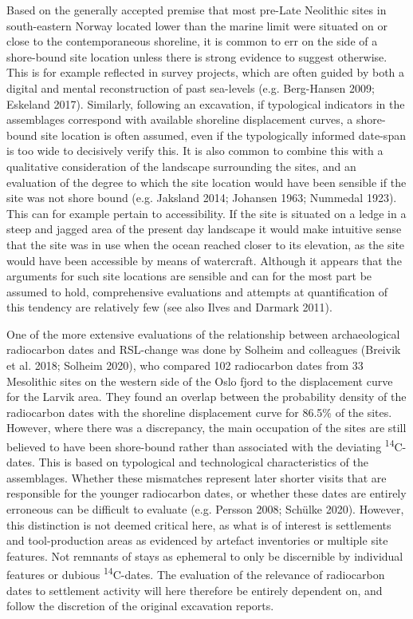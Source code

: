 \documentclass[
]{article}
\begin{document}
Based on the generally accepted premise that most pre-Late Neolithic sites in south-eastern Norway located lower than the marine limit were situated on or close to the contemporaneous shoreline, it is common to err on the side of a shore-bound site location unless there is strong evidence to suggest otherwise. This is for example reflected in survey projects, which are often guided by both a digital and mental reconstruction of past sea-levels (e.g. Berg-Hansen 2009; Eskeland 2017). Similarly, following an excavation, if typological indicators in the assemblages correspond with available shoreline displacement curves, a shore-bound site location is often assumed, even if the typologically informed date-span is too wide to decisively verify this. It is also common to combine this with a qualitative consideration of the landscape surrounding the sites, and an evaluation of the degree to which the site location would have been sensible if the site was not shore bound (e.g. Jaksland 2014; Johansen 1963; Nummedal 1923). This can for example pertain to accessibility. If the site is situated on a ledge in a steep and jagged area of the present day landscape it would make intuitive sense that the site was in use when the ocean reached closer to its elevation, as the site would have been accessible by means of watercraft. Although it appears that the arguments for such site locations are sensible and can for the most part be assumed to hold, comprehensive evaluations and attempts at quantification of this tendency are relatively few (see also Ilves and Darmark 2011).

One of the more extensive evaluations of the relationship between archaeological radiocarbon dates and RSL-change was done by Solheim and colleagues (Breivik et al. 2018; Solheim 2020), who compared 102 radiocarbon dates from 33 Mesolithic sites on the western side of the Oslo fjord to the displacement curve for the Larvik area. They found an overlap between the probability density of the radiocarbon dates with the shoreline displacement curve for 86.5\% of the sites. However, where there was a discrepancy, the main occupation of the sites are still believed to have been shore-bound rather than associated with the deviating \textsuperscript{14}C-dates. This is based on typological and technological characteristics of the assemblages. Whether these mismatches represent later shorter visits that are responsible for the younger radiocarbon dates, or whether these dates are entirely erroneous can be difficult to evaluate (e.g. Persson 2008; Schülke 2020). However, this distinction is not deemed critical here, as what is of interest is settlements and tool-production areas as evidenced by artefact inventories or multiple site features. Not remnants of stays as ephemeral to only be discernible by individual features or dubious \textsuperscript{14}C-dates. The evaluation of the relevance of radiocarbon dates to settlement activity will here therefore be entirely dependent on, and follow the discretion of the original excavation reports.
\end{document}
